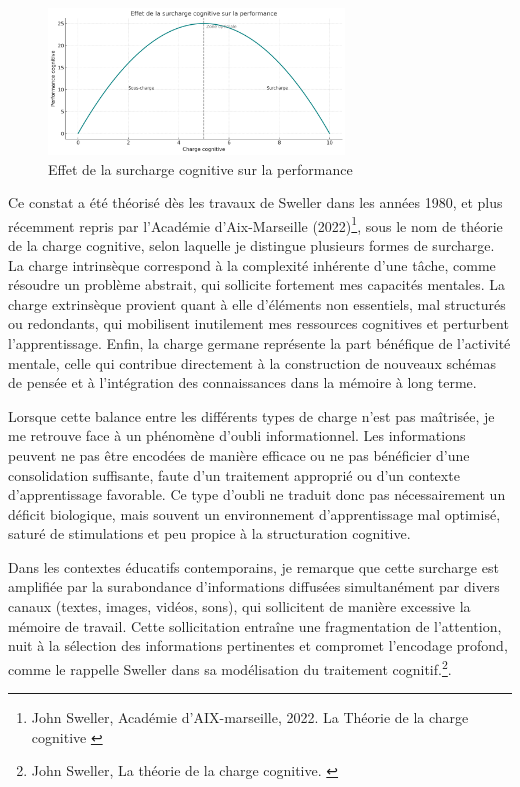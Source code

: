 \documentclass[11pt,a4paper]{report}
\begin{document}
\begin{figure}[h]
    \centering
    \includegraphics[width=0.7\textwidth]{images/1.2.3.png}
    \caption{Effet de la surcharge cognitive sur la performance}
    \label{fig:1.2.3}
\end{figure}

Ce constat a été théorisé dès les travaux de Sweller dans les années 1980, et plus récemment repris par l’Académie d’Aix-Marseille (2022)\footnote{John Sweller, Académie d'AIX-marseille, 2022. La Théorie de la charge cognitive \cite{sweller}}, sous le nom de théorie de la charge cognitive, selon laquelle je distingue plusieurs formes de surcharge. La charge intrinsèque correspond à la complexité inhérente d’une tâche, comme résoudre un problème abstrait, qui sollicite fortement mes capacités mentales. La charge extrinsèque provient quant à elle d’éléments non essentiels, mal structurés ou redondants, qui mobilisent inutilement mes ressources cognitives et perturbent l’apprentissage. Enfin, la charge germane représente la part bénéfique de l’activité mentale, celle qui contribue directement à la construction de nouveaux schémas de pensée et à l’intégration des connaissances dans la mémoire à long terme.

Lorsque cette balance entre les différents types de charge n’est pas maîtrisée, je me retrouve face à un phénomène d’oubli informationnel. Les informations peuvent ne pas être encodées de manière efficace ou ne pas bénéficier d’une consolidation suffisante, faute d’un traitement approprié ou d’un contexte d’apprentissage favorable. Ce type d’oubli ne traduit donc pas nécessairement un déficit biologique, mais souvent un environnement d’apprentissage mal optimisé, saturé de stimulations et peu propice à la structuration cognitive.

Dans les contextes éducatifs contemporains, je remarque que cette surcharge est amplifiée par la surabondance d’informations diffusées simultanément par divers canaux (textes, images, vidéos, sons), qui sollicitent de manière excessive la mémoire de travail. Cette sollicitation entraîne une fragmentation de l’attention, nuit à la sélection des informations pertinentes et compromet l’encodage profond, comme le rappelle Sweller dans sa modélisation du traitement cognitif.\footnote{John Sweller, La théorie de la charge cognitive. \cite{sweller2}}.
\end{document}
